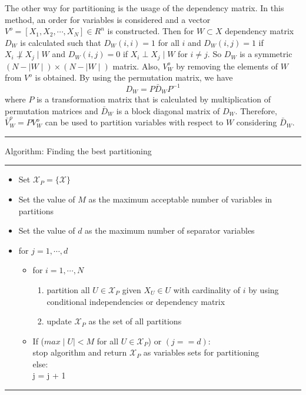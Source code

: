 \documentclass{article}
\newcommand{\X}{\mathcal{X}}
\begin{document}
The other way for partitioning is the usage of the dependency matrix. In this method, an order for variables is considered and a vector $V^o = [X_1, X_2, \cdots, X_N] \in R^n$ is constructed. Then for $W \subset X$ dependency matrix $D_W$ is calculated such that $D_W(i,i) = 1$ for all $i$ and $D_W(i,j) = 1$ if $X_i\not \perp X_j \mid W$ and $D_W(i,j) = 0$ if $X_i\perp X_j \mid W$ for $i\not = j$. So $D_W$ is a symmetric $(N-\mid W \mid) \times (N-\mid W \mid)$ matrix. Also, $V^o_W$ by removing the elements of $W$ from $V^o$ is obtained. By using the permutation matrix, we have
$$D_W = P\bar D_W P^{-1} $$
where $P$ is a transformation matrix that is calculated by multiplication of permutation matrices and $\bar D_W$ is a block diagonal matrix of $D_W$. Therefore, $\bar V^o_W = P V^o_W$ can be used to partition variables with respect to $W$ considering $\bar D_W$.
\par\noindent\rule{\textwidth}{0.5pt}
\vspace{-0.4cm}
Algorithm: Finding the best partitioning
\vspace{0.2cm}
\par\noindent\rule{\textwidth}{0.5pt}
\begin{itemize}
\item Set $\X_P = \{\X\}$
    \item Set the value of $M$ as the maximum acceptable number of variables in partitions
    \item Set the value of $d$ as the maximum number of separator variables 
    \item for $j = 1, \cdots , d$
    \begin{itemize}
        \item for $i = 1,\cdots, N$
            \begin{enumerate}         
                \item partition all $U\in \X_P$ given $X_U \in U$ with cardinality of $i$ by using conditional independencies or dependency matrix
                \item update $\X_P$ as the set of all partitions
            \end{enumerate}
        \item If ($max \mid U \mid < M$ for all $U\in \X_P$) or $(j == d)$:\\
        stop algorithm and return $\X_P$ as variables sets for partitioning\\
        else:\\
        j = j + 1
        
    \end{itemize}
\end{itemize}
\vspace{-0.4cm}
\par\noindent\rule{\textwidth}{0.5pt}
\end{document}
